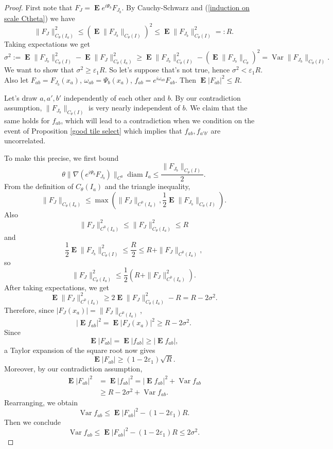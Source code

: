 \documentclass[reqno,12pt]{amsart}
\DeclareMathOperator*{\Expect}{\mathbf E}
\DeclareMathOperator{\Var}{\mathrm{Var}}
\DeclareMathOperator{\diam}{diam}
\theoremstyle{definition}
\numberwithin{equation}{section}
\begin{document}
\begin{proof}
First note that $F_J = \Expect e^{i\Psi_b} F_{J_b}$.
By Cauchy-Schwarz and (\ref{induction on scale Ctheta}) we have 
$$\|F_J\|_{C_\theta(I_a)}^2 \leq (\Expect \|F_{J_b}\|_{C_\theta(I)})^2 \leq \Expect \|F_{J_b}\|_{C_\theta(I)}^2 =: R.$$
Taking expectations we get 
$$\sigma^2 := \Expect \|F_{J_b}\|_{C_\theta(I)}^2 - \Expect \|F_J\|_{C_\theta(I_a)}^2 \geq \Expect \|F_{J_b}\|_{C_\theta(I)}^2 - (\Expect \|F_{J_b}\|_{C_\theta})^2 = \Var \|F_{J_b}\|_{C_\theta(I)}.$$
We want to show that $\sigma^2 \geq \varepsilon_1 R$.
So let's suppose that's not true, hence $\sigma^2 < \varepsilon_1 R$.
Also let $F_{ab} = F_{J_b}(x_a)$, $\omega_{ab} = \Psi_b(x_a)$, $f_{ab} = e^{i\omega_{ab}} F_{ab}$.
Then $\Expect |F_{ab}|^2 \leq R$.

Let's draw $a,a',b'$ independently of each other and $b$.
By our contradiction assumption, $\|F_{J_b}\|_{C_\theta(I)}$ is very nearly independent of $b$.
We claim that the same holds for $f_{ab}$, which will lead to a contradiction when we condition on the event of Proposition \ref{good tile select} which implies that $f_{ab}, f_{a'b'}$ are uncorrelated.

To make this precise, we first bound
$$\theta \|\nabla (e^{i\Psi_b}F_{J_b})\|_{C^0} \diam I_a \leq \frac{\|F_{J_b}\|_{C_\theta(I)}}{2}.$$
From the definition of $C_\theta(I_a)$ and the triangle inequality,
$$\|F_J\|_{C_\theta(I_a)} \leq \max\left(\|F_J\|_{C^0(I_a)}, \frac{1}{2} \Expect \|F_{J_b}\|_{C_\theta(I)}\right).$$
Also
$$\|F_J\|_{C^0(I_a)}^2 \leq \|F_J\|_{C_\theta(I_a)}^2 \leq R$$
and
$$\frac{1}{2} \Expect \|F_{J_b}\|_{C_\theta(I)}^2 \leq \frac{R}{2} \leq R + \|F_J\|_{C^0(I_a)},$$
so
$$\|F_J\|_{C_\theta(I_a)}^2 \leq \frac{1}{2} \left(R + \|F_J\|_{C^0(I_a)}^2\right).$$
After taking expectations, we get 
$$\Expect \|F_J\|_{C^0(I_a)}^2 \geq 2 \Expect \|F_J\|_{C_\theta(I_a)}^2 - R = R - 2\sigma^2.$$
Therefore, since $|F_J(x_a)| = \|F_J\|_{C^0(I_a)}$,
$$|\Expect f_{ab}|^2 = \Expect |F_J(x_a)|^2 \geq R - 2\sigma^2.$$
Since
$$\Expect |F_{ab}| = \Expect |f_{ab}| \geq |\Expect f_{ab}|,$$
a Taylor expansion of the square root now gives 
\begin{equation}\Expect |F_{ab}| \geq (1 - 2\varepsilon_1) \sqrt R. \label{lower bound on EF}\end{equation}
Moreover, by our contradiction assumption,
\begin{align*}
    \Expect |F_{ab}|^2 &= \Expect |f_{ab}|^2 = |\Expect f_{ab}|^2 + \Var f_{ab} \\
    &\geq R - 2\sigma^2 + \Var f_{ab}.
\end{align*}
Rearranging, we obtain
$$\Var f_{ab} \leq \Expect |F_{ab}|^2 - (1 - 2\varepsilon_1) R.$$
Then we conclude 
\begin{equation}
    \Var f_{ab} \leq \Expect |F_{ab}|^2 - (1 - 2\varepsilon_1) R \leq 2\sigma^2. \label{lower bound on expected argmax}
\end{equation}


\end{proof}
\end{document}
